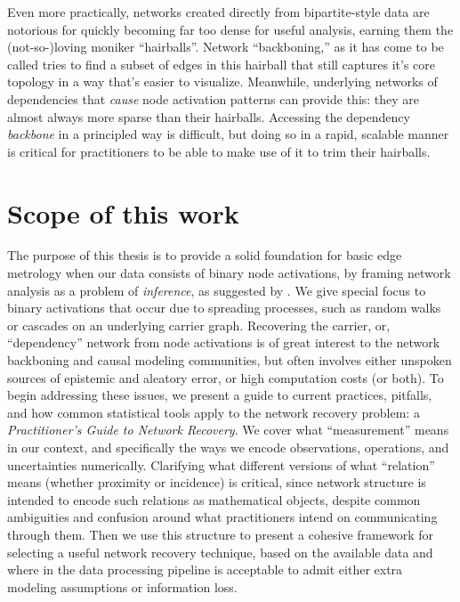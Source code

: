 \documentclass[%
	12pt,
		oneside,
		letterpaper
]{book}
\begin{document}
Even more practically, networks created directly from bipartite-style
data are notorious for quickly becoming far too dense for useful
analysis, earning them the (not-so-)loving moniker ``hairballs''.
Network ``backboning,'' as it has come to be called tries to find a
subset of edges in this hairball that still captures it's core topology
in a way that's easier to
visualize.\autocite{twostagealgorithm_Slater2009,backbonebipartiteprojections_Neal2014}
Meanwhile, underlying networks of dependencies that \emph{cause} node
activation patterns can provide this: they are almost always more sparse
than their hairballs. Accessing the dependency \emph{backbone} in a
principled way is difficult, but doing so in a rapid, scalable manner is
critical for practitioners to be able to make use of it to trim their
hairballs.

\section{Scope of this work}\label{scope-of-this-work}

The purpose of this thesis is to provide a solid foundation for basic
edge metrology when our data consists of binary node activations, by
framing network analysis as a problem of \emph{inference}, as suggested
by \textcite{Statisticalinferencelinks_Peel2022}. We give special focus
to binary activations that occur due to spreading processes, such as
random walks or cascades on an underlying carrier graph. Recovering the
carrier, or, ``dependency'' network from node activations is of great
interest to the network backboning and causal modeling communities, but
often involves either unspoken sources of epistemic and aleatory error,
or high computation costs (or both). To begin addressing these issues,
we present a guide to current practices, pitfalls, and how common
statistical tools apply to the network recovery problem: a
\emph{Practitioner's Guide to Network Recovery}. We cover what
``measurement'' means in our context, and specifically the ways we
encode observations, operations, and uncertainties numerically.
Clarifying what different versions of what ``relation'' means (whether
proximity or incidence) is critical, since network structure is intended
to encode such relations as mathematical objects, despite common
ambiguities and confusion around what practitioners intend on
communicating through them. Then we use this structure to present a
cohesive framework for selecting a useful network recovery technique,
based on the available data and where in the data processing pipeline is
acceptable to admit either extra modeling assumptions or information
loss.
\end{document}
